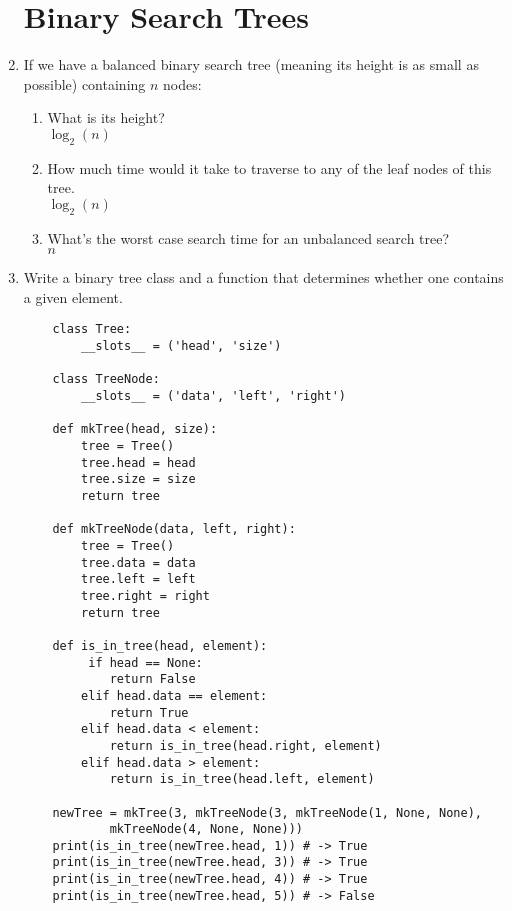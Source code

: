 \documentclass[11pt]{article}
\newenvironment{answer}{\large\lstset{basicstyle=\tiny\ttfamily}\color{white}}{}
\newenvironment{answer}{\large\lstset{basicstyle=\large\ttfamily}\color{red}}{}
\begin{document}
\begin{enumerate}
\section*{Binary Search Trees}

\item If we have a balanced binary search tree (meaning its height is as small as
    possible) containing $n$ nodes:
        \begin{enumerate}
            \item What is its height? \\
                \begin{answer}
                $\log_2(n)$
                \end{answer}
            \item How much time would it take to traverse to any of the leaf
            nodes of this tree. \\
                \begin{answer}
                $\log_2(n)$
                \end{answer}
            \item What's the worst case search time for an unbalanced search
            tree? \\
                \begin{answer}
                $n$
                \end{answer}
        \end{enumerate}
\pagebreak
\item Write a binary tree class and a function that determines whether one contains a given element.
		\begin{answer}
		\begin{lstlisting}
	class Tree:
		__slots__ = ('head', 'size')

	class TreeNode:
		__slots__ = ('data', 'left', 'right')

	def mkTree(head, size):
		tree = Tree()
		tree.head = head
		tree.size = size
		return tree

	def mkTreeNode(data, left, right):
		tree = Tree()
		tree.data = data
		tree.left = left
		tree.right = right
		return tree

	def is_in_tree(head, element):
		 if head == None:
			return False
		elif head.data == element:
			return True
		elif head.data < element:
			return is_in_tree(head.right, element)
		elif head.data > element:
			return is_in_tree(head.left, element)

	newTree = mkTree(3, mkTreeNode(3, mkTreeNode(1, None, None),
			mkTreeNode(4, None, None)))
	print(is_in_tree(newTree.head, 1)) # -> True
	print(is_in_tree(newTree.head, 3)) # -> True
	print(is_in_tree(newTree.head, 4)) # -> True
	print(is_in_tree(newTree.head, 5)) # -> False
		\end{lstlisting}
		\end{answer}


\end{enumerate}
\end{document}
